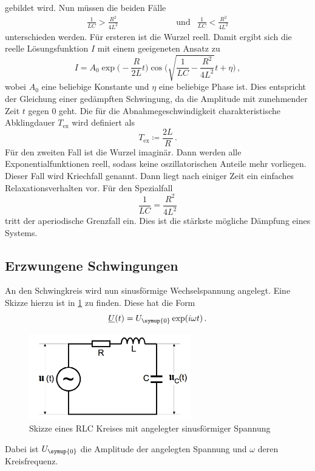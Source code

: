gebildet wird. Nun müssen die beiden Fälle
\begin{align}
  \frac{1}{LC}>\frac{R^2}{4L^2} & \qquad\qquad\qquad\text{und} & \frac{1}{LC}<\frac{R^2}{4L^2}
\end{align}
unterschieden werden. Für ersteren ist die Wurzel reell. Damit ergibt sich die
reelle Lösungsfunktion $I$ mit einem geeigeneten Ansatz zu
\begin{equation}
  I=A_{\text{0}}\exp\biggl(-\frac{R}{2L}t\biggr)\cos\Biggl(
  \sqrt{\frac{1}{LC}-\frac{R^2}{4L^2}}t+\eta\Biggr)\,,
  \label{eqn:ifunktion}
\end{equation}
wobei $A_{\text{0}}$ eine beliebige Konstante und $\eta$ eine beliebige Phase ist.
Dies entspricht der Gleichung einer gedämpften Schwingung, da die Amplitude mit zunehmender
Zeit $t$ gegen $0$ geht.
Die für die Abnahmegeschwindigkeit charakteristische Abklingdauer $T_{\text{ex}}$
wird definiert als
\begin{equation}
  T_{\text{ex}}\coloneq\frac{2L}{R} \,.
  \label{eqn:abklingdauer}
\end{equation}
Für den zweiten Fall ist die Wurzel imaginär. Dann werden alle Exponentialfunktionen
reell, sodass keine oszillatorischen Anteile mehr vorliegen. Dieser Fall wird
Kriechfall genannt. Dann liegt nach einiger Zeit ein einfaches Relaxationsverhalten
vor. Für den Spezialfall
\begin{equation}
  \frac{1}{LC}=\frac{R^2}{4L^2}
  \label{eqn:rap}
\end{equation}
tritt der aperiodische Grenzfall ein. Dies ist die stärkste mögliche Dämpfung eines
Systems.

\subsection{Erzwungene Schwingungen}
\label{Erzwungene_Schwingungen}

An den Schwingkreis wird nun sinusförmige Wechselspannung angelegt. Eine Skizze
hierzu ist in \ref{fig:RLC_sinus} zu finden. Diese hat die Form
\begin{equation}
  \underline{U}(t)=U_{\symup{0}}\exp(i\omega t) \,.
\end{equation}

\begin{figure}
  \centering
  \includegraphics[width=200pt]{data/angeregter_schwingkreis_theorie.png}
  \caption{Skizze eines RLC Kreises mit angelegter sinusförmiger Spannung
  \cite{Versuchsanleitung1}}
  \label{fig:RLC_sinus}
\end{figure}
Dabei ist $U_{\symup{0}}$ die Amplitude der angelegten Spannung und $\omega$ deren
Kreisfrequenz.

